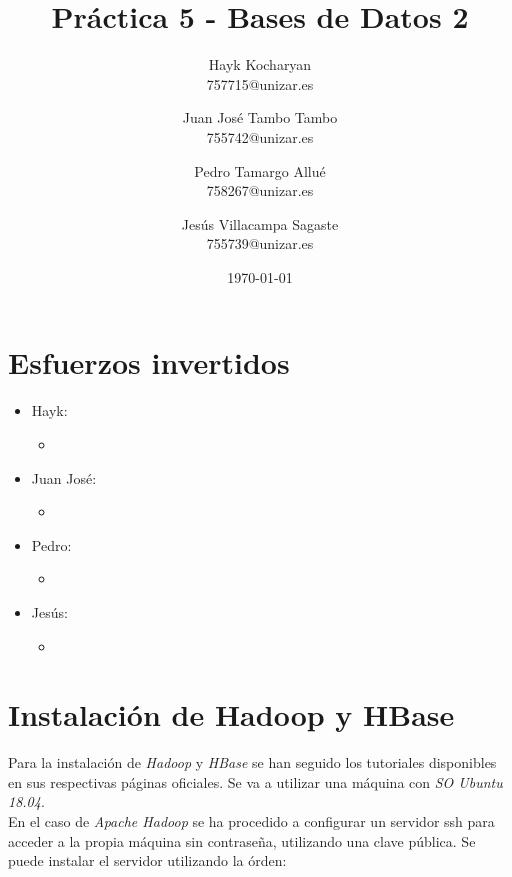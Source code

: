 \documentclass[11pt,a4paper]{article}
\begin{document}
\begin{titlepage}
	\title{{\Huge \textbf{Práctica 5 - Bases de Datos 2}}}
	\author{
	  Hayk Kocharyan\\
	  757715@unizar.es
	  \and
	  Juan José Tambo Tambo\\
	  755742@unizar.es
	  \and
	  Pedro Tamargo Allué\\
	  758267@unizar.es
	  \and
	  Jesús Villacampa Sagaste\\
	  755739@unizar.es
	}
	\date{\today}
	
	\clearpage\maketitle
	\thispagestyle{empty}
	\tableofcontents
	\listoffigures
\end{titlepage}

\section{Esfuerzos invertidos}

\begin{itemize}
\item Hayk:
	\begin{itemize}
	\item
	\end{itemize}
\item Juan José:
	\begin{itemize}
	\item
	\end{itemize}
\item Pedro:
	\begin{itemize}
	\item
	\end{itemize}
\item Jesús:
	\begin{itemize}
	\item
	\end{itemize}
\end{itemize}

\section{Instalación de Hadoop y HBase}

Para la instalación de \emph{Hadoop} y \emph{HBase} se han seguido los tutoriales disponibles en sus respectivas páginas oficiales. Se va a utilizar una máquina con \emph{SO Ubuntu 18.04}. \\
En el caso de \emph{Apache Hadoop} se ha procedido a configurar un servidor ssh para acceder a la propia máquina sin contraseña, utilizando una clave pública. Se puede instalar el servidor utilizando la órden:
\end{document}
